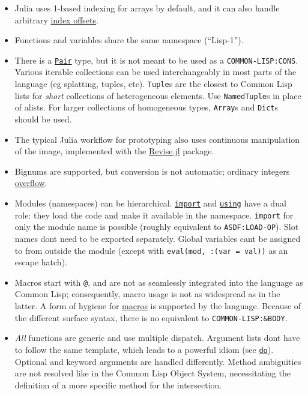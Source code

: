 \begin{itemize}
\item Julia uses 1-based indexing for arrays by default, and it can also handle arbitrary \hyperlink{1238988360302116626}{index offsets}.


\item Functions and variables share the same namespace (“Lisp-1”).


\item There is a \hyperlink{14946515604348703614}{\texttt{Pair}} type, but it is not meant to be used as a \texttt{COMMON-LISP:CONS}. Various iterable collections can be used interchangeably in most parts of the language (eg splatting, tuples, etc). \texttt{Tuple}s are the closest to Common Lisp lists for \emph{short} collections of heterogeneous elements. Use \texttt{NamedTuple}s in place of alists. For larger collections of homogeneous types, \texttt{Array}s and \texttt{Dict}s should be used.


\item The typical Julia workflow for prototyping also uses continuous manipulation of the image, implemented with the \href{https://github.com/timholy/Revise.jl}{Revise.jl} package.


\item Bignums are supported, but conversion is not automatic; ordinary integers \hyperlink{17610230595270045080}{overflow}.


\item Modules (namespaces) can be hierarchical. \hyperlink{16252475688663093021}{\texttt{import}} and \hyperlink{169458112978175560}{\texttt{using}} have a dual role: they load the code and make it available in the namespace. \texttt{import} for only the module name is possible (roughly equivalent to \texttt{ASDF:LOAD-OP}). Slot names don{\textquotesingle}t need to be exported separately. Global variables can{\textquotesingle}t be assigned to from outside the module (except with \texttt{eval(mod, :(var = val))} as an escape hatch).


\item Macros start with \texttt{@}, and are not as seamlessly integrated into the language as Common Lisp; consequently, macro usage is not as widespread as in the latter. A form of hygiene for \href{@ref Metaprogramming}{macros} is supported by the language. Because of the different surface syntax, there is no equivalent to \texttt{COMMON-LISP:\&BODY}.


\item \emph{All} functions are generic and use multiple dispatch. Argument lists don{\textquotesingle}t have to follow the same template, which leads to a powerful idiom (see \hyperlink{16455129305818705265}{\texttt{do}}). Optional and keyword arguments are handled differently. Method ambiguities are not resolved like in the Common Lisp Object System, necessitating the definition of a more specific method for the intersection.



\end{itemize}
